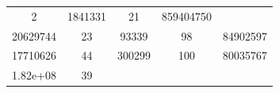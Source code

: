 \documentclass[]{article}
\begin{document}
\begin{longtable}[]{@{}ccccc@{}}
\begin{minipage}[t]{0.12\columnwidth}\centering\strut
2
\strut\end{minipage} &
\begin{minipage}[t]{0.12\columnwidth}\centering\strut
1841331
\strut\end{minipage} &
\begin{minipage}[t]{0.12\columnwidth}\centering\strut
21
\strut\end{minipage} &
\begin{minipage}[t]{0.12\columnwidth}\centering\strut
859404750
\strut\end{minipage}\tabularnewline
\begin{minipage}[t]{0.14\columnwidth}\centering\strut
20629744
\strut\end{minipage} &
\begin{minipage}[t]{0.12\columnwidth}\centering\strut
23
\strut\end{minipage} &
\begin{minipage}[t]{0.12\columnwidth}\centering\strut
93339
\strut\end{minipage} &
\begin{minipage}[t]{0.12\columnwidth}\centering\strut
98
\strut\end{minipage} &
\begin{minipage}[t]{0.12\columnwidth}\centering\strut
84902597
\strut\end{minipage}\tabularnewline
\begin{minipage}[t]{0.14\columnwidth}\centering\strut
17710626
\strut\end{minipage} &
\begin{minipage}[t]{0.12\columnwidth}\centering\strut
44
\strut\end{minipage} &
\begin{minipage}[t]{0.12\columnwidth}\centering\strut
300299
\strut\end{minipage} &
\begin{minipage}[t]{0.12\columnwidth}\centering\strut
100
\strut\end{minipage} &
\begin{minipage}[t]{0.12\columnwidth}\centering\strut
80035767
\strut\end{minipage}\tabularnewline
\begin{minipage}[t]{0.14\columnwidth}\centering\strut
1.82e+08
\strut\end{minipage} &
\begin{minipage}[t]{0.12\columnwidth}\centering\strut
39
\strut\end{minipage} &

\end{longtable}
\end{document}
